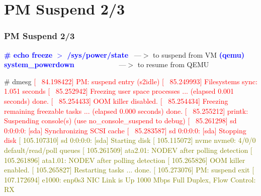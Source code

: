 \documentclass[aspectratio=169]{beamer}
\begin{document}
\section{PM Suspend 2/3}
\begin{frame}
\frametitle{PM Suspend 2/3}
\begin{block}{}
\scriptsize
\textbf{\textcolor{blue}{\# echo freeze $>$ /sys/power/state}} \ ---$>$ to suspend from VM \newline
\textbf{\textcolor{blue}{(qemu) system\_powerdown}} \ \ \ \ \ \ \ \ \ \ \ \  ---$>$ to resume from QEMU \newline

{\scriptsize
\# dmesg \newline
\textcolor{red}{[  \ 84.198422] PM: suspend entry (s2idle)} \newline
\textcolor{red}{[  \ 85.249993] Filesystems sync: 1.051 seconds} \newline
\textcolor{red}{[  \ 85.252942] Freezing user space processes ... (elapsed 0.001 seconds) done.} \newline
\textcolor{red}{[  \ 85.254433] OOM killer disabled.} \newline
\textcolor{red}{[  \ 85.254434] Freezing remaining freezable tasks ... (elapsed 0.000 seconds) done.} \newline
\textcolor{red}{[  \ 85.255212] printk: Suspending console(s) (use no\_console\_suspend to debug)} \newline
\textcolor{red}{[  \ 85.261298] sd 0:0:0:0: [sda] Synchronizing SCSI cache} \newline
\textcolor{red}{[  \ 85.283587] sd 0:0:0:0: [sda] Stopping disk} \newline
\textcolor{olive}{[  105.107310] sd 0:0:0:0: [sda] Starting disk} \newline
\textcolor{olive}{[  105.115072] nvme nvme0: 4/0/0 default/read/poll queues} \newline
\textcolor{olive}{[  105.261509] ata2.01: NODEV after polling detection} \newline
\textcolor{olive}{[  105.261896] ata1.01: NODEV after polling detection} \newline
\textcolor{olive}{[  105.265826] OOM killer enabled.} \newline
\textcolor{olive}{[  105.265827] Restarting tasks ... done.} \newline
\textcolor{olive}{[  105.273076] PM: suspend exit} \newline
\textcolor{olive}{[  107.172694] e1000: enp0s3 NIC Link is Up 1000 Mbps Full Duplex, Flow Control: RX}
}
\end{block}
\end{frame}
\end{document}

